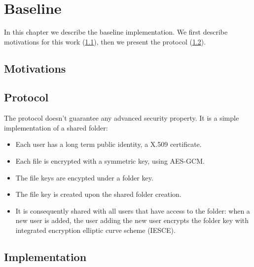 \chapter{Baseline}\label{ch:baseline}

In this chapter we describe the baseline implementation.
We first describe motivations for this work (\cref{sc:baseline-motivations}),
then we present the protocol (\cref{sc:baseline-protocol}).

\section{Motivations}\label{sc:baseline-motivations}

\section{Protocol}\label{sc:baseline-protocol}

The protocol doesn't guarantee any advanced security property.
It is a simple implementation of a shared folder:
\begin{itemize}
    \item Each user has a long term public identity, a X.509 certificate.
    \item Each file is encrypted with a symmetric key, using AES-GCM.
    \item The file keys are encypted under a folder key.
    \item The file key is created upon the shared folder creation.
    \item It is consequently shared with all users that have access to the folder: when a new user is added, the user adding the new user encrypts the folder key with integrated encryption elliptic curve scheme (IESCE).
\end{itemize}

\section{Implementation}
